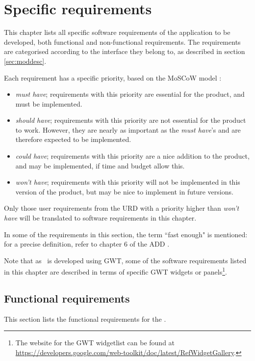 \chapter{Specific requirements}
\label{chap:specreq}
This chapter lists all specific software requirements of the application to be developed, both functional and non-functional requirements. The requirements are categorised according to the interface they belong to, as described in section \ref{sec:moddesc}.

Each requirement has a specific priority, based on the MoSCoW model \cite{moscow}:

\begin{itemize}
    \item \emph{must have}; requirements with this priority are essential for the product, and must be implemented.
    \item \emph{should have}; requirements with this priority are not essential for the product to work. However, they are nearly as important as the \emph{must have}'s and are therefore expected to be implemented.
    \item \emph{could have}; requirements with this priority are a nice addition to the product, and may be implemented, if time and budget allow this.
    \item \emph{won't have}; requirements with this priority will not be implemented in this version of the product, but may be nice to implement in future versions.
\end{itemize}

\noindent Only those user requirements from the URD \cite{urd} with a priority higher than \emph{won't have} will be translated to software requirements in this chapter.

\fpstartparagraph{} In some of the requirements in this section, the term ``fast enough" is mentioned: for a precise definition, refer to chapter 6 of the ADD \cite{add}.

\fpstartparagraph{} Note that as \applicationname\ is developed using GWT, some of the software requirements listed in this chapter are described in terms of specific GWT widgets or panels\footnote{The website for the GWT widgetlist can be found at \url{https://developers.google.com/web-toolkit/doc/latest/RefWidgetGallery}.}.

\section{Functional requirements}
\label{sec:funcreq}
This section lists the functional requirements for the \applicationname.

